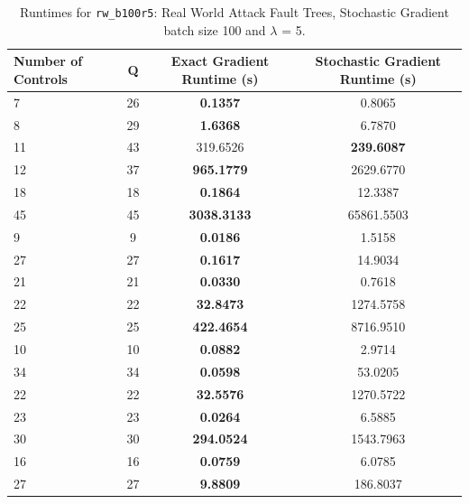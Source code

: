 \documentclass{article}
\begin{document}
\begin{table}[h]
\centering
\begin{tabular}{lccc}
\toprule
Number of Controls & Q & Exact Gradient Runtime (s) & Stochastic Gradient Runtime (s) \\
\midrule
7 & 26 & \textbf{0.1357} & 0.8065 \\
8 & 29 & \textbf{1.6368} & 6.7870 \\
11 & 43 & 319.6526 & \textbf{239.6087} \\
12 & 37 & \textbf{965.1779} & 2629.6770 \\
18 & 18 & \textbf{0.1864} & 12.3387 \\
45 & 45 & \textbf{3038.3133} & 65861.5503 \\
9 & 9 & \textbf{0.0186} & 1.5158 \\
27 & 27 & \textbf{0.1617} & 14.9034 \\
21 & 21 & \textbf{0.0330} & 0.7618 \\
22 & 22 & \textbf{32.8473} & 1274.5758 \\
25 & 25 & \textbf{422.4654} & 8716.9510 \\
10 & 10 & \textbf{0.0882} & 2.9714 \\
34 & 34 & \textbf{0.0598} & 53.0205 \\
22 & 22 & \textbf{32.5576} & 1270.5722 \\
23 & 23 & \textbf{0.0264} & 6.5885 \\
30 & 30 & \textbf{294.0524} & 1543.7963 \\
16 & 16 & \textbf{0.0759} & 6.0785 \\
27 & 27 & \textbf{9.8809} & 186.8037 \\
\bottomrule
\end{tabular}
\caption{Runtimes for \texttt{rw\_b100r5}: Real World Attack Fault Trees, Stochastic Gradient batch size 100 and $\lambda$ = 5.}
\end{table}
\end{document}
